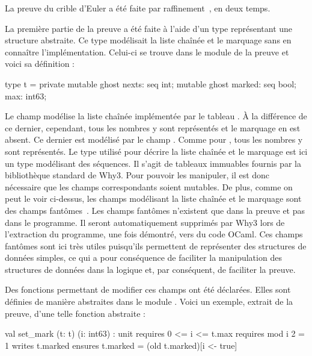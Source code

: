 \documentclass[a4paper]{easychair}
\begin{document}


La preuve du crible d'Euler a été faite par
raffinement~\cite{paskevich20isola}, en deux temps.

La première partie de la preuve a été faite à l'aide d'un type 
représentant une structure abstraite.
Ce type modélisait la liste chaînée et le marquage sans en connaître
l'implémentation. Celui-ci se trouve dans le module 
de la preuve et voici sa définition :
\begin{why3}
type t = private {
  mutable ghost nexts: seq int;
  mutable ghost marked: seq bool;
  max: int63;
}
\end{why3}
Le champ  modélise la liste chaînée implémentée par le
tableau . À la différence de ce dernier, cependant, tous les
nombres y sont représentés et le marquage en est absent.
Ce dernier est modélisé par le champ . Comme pour ,
tous les nombres y sont représentés.
Le type  utilisé pour décrire la liste chaînée et le marquage
est ici un type modélisant des séquences.
Il s'agit de tableaux immuables fournis par la bibliothèque standard
de Why3. Pour pouvoir les manipuler, il est donc nécessaire que les champs
correspondants soient mutables.
De plus, comme on peut le voir ci-dessus, les champs modélisant la liste
chaînée et le marquage sont des champs fantômes~\cite{ghost-code}.
Les champs fantômes n'existent que dans la preuve et pas dans
le programme. Il seront automatiquement supprimés par Why3 lors
de l'extraction du programme, une fois démontré, vers du code OCaml.
Ces champs fantômes sont ici très utiles puisqu'ils permettent de représenter
des structures de données simples, ce qui a pour conséquence de faciliter
la manipulation des structures de données dans la logique et, par conséquent,
de faciliter la preuve.

Des fonctions permettant de modifier ces champs ont été déclarées.
Elles sont définies de manière abstraites dans le module .
Voici un exemple, extrait de la preuve, d'une telle fonction abstraite :
\begin{why3}
val set_mark (t: t) (i: int63) : unit
  requires { 0 <= i <= t.max }
  requires { mod i 2 = 1 }
  writes   { t.marked }
  ensures  { t.marked = (old t.marked)[i <- true] }
\end{why3}
\end{document}
